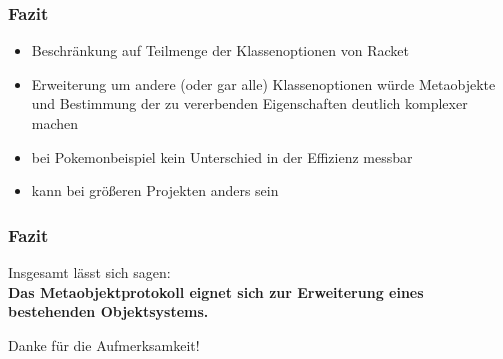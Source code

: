 \documentclass{beamer}
\begin{document}
\begin{frame}  
 \frametitle{Fazit}
  \begin{itemize}
  \item Beschränkung auf Teilmenge der Klassenoptionen von Racket
  \item Erweiterung um andere (oder gar alle) Klassenoptionen würde Metaobjekte und Bestimmung der zu vererbenden Eigenschaften deutlich komplexer machen
  \item bei Pokemonbeispiel kein Unterschied in der Effizienz messbar
  \item kann bei größeren Projekten anders sein
 \end{itemize}
\end{frame}

\begin{frame}
 \frametitle{Fazit}
 \begin{center}
 Insgesamt lässt sich sagen:\\
 \vspace{1cm}
 \textbf{Das Metaobjektprotokoll eignet sich zur Erweiterung eines bestehenden Objektsystems.}
 \end{center}
\end{frame}


\begin{frame}
\begin{center}
  Danke für die Aufmerksamkeit!
\end{center}
\end{frame}
\end{document}
